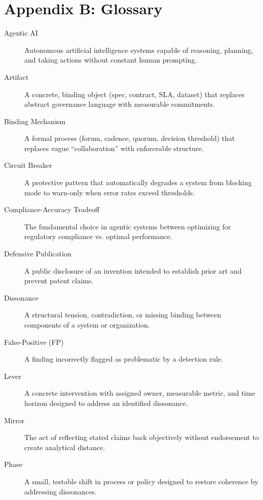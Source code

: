 \documentclass[11pt,a4paper]{article}
\begin{document}
\section*{Appendix B: Glossary}
\begin{description}
\item[Agentic AI] Autonomous artificial intelligence systems capable of reasoning, planning, and taking actions without constant human prompting.

\item[Artifact] A concrete, binding object (spec, contract, SLA, dataset) that replaces abstract governance language with measurable commitments.

\item[Binding Mechanism] A formal process (forum, cadence, quorum, decision threshold) that replaces vague ``collaboration'' with enforceable structure.

\item[Circuit Breaker] A protective pattern that automatically degrades a system from blocking mode to warn-only when error rates exceed thresholds.

\item[Compliance-Accuracy Tradeoff] The fundamental choice in agentic systems between optimizing for regulatory compliance vs. optimal performance.

\item[Defensive Publication] A public disclosure of an invention intended to establish prior art and prevent patent claims.

\item[Dissonance] A structural tension, contradiction, or missing binding between components of a system or organization.

\item[False-Positive (FP)] A finding incorrectly flagged as problematic by a detection rule.

\item[Lever] A concrete intervention with assigned owner, measurable metric, and time horizon designed to address an identified dissonance.

\item[Mirror] The act of reflecting stated claims back objectively without endorsement to create analytical distance.

\item[Phase] A small, testable shift in process or policy designed to restore coherence by addressing dissonances.


\end{description}
\end{document}
